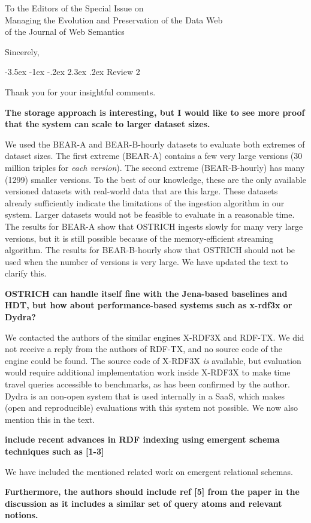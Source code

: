\documentclass{letter}
\makeatletter
\newcounter{section}
\newcommand\section{\@startsection {section}{1}{\z@}%
                                   {-3.5ex \@plus -1ex \@minus -.2ex}%
                                   {2.3ex \@plus.2ex}%
                                   {\normalfont\Large\bfseries}}
\makeatother
\begin{document}
\begin{letter}{To the Editors of the Special Issue on\\Managing the Evolution and Preservation of the Data Web\\of the Journal of Web Semantics}
\closing{Sincerely,}

\pagebreak
\section{Review 2}

Thank you for your insightful comments.

\textbf{The storage approach is interesting, but I would like to see more proof that the system can scale to larger dataset sizes.}

We used the BEAR-A and BEAR-B-hourly datasets to evaluate both extremes of dataset sizes.
The first extreme (BEAR-A) contains a few very large versions (30 million triples for \emph{each version}).
The second extreme (BEAR-B-hourly) has many (1299) smaller versions.
To the best of our knowledge, these are the only available versioned datasets with real-world data
that are this large.
These datasets already sufficiently indicate the limitations of the ingestion algorithm in our system.
Larger datasets would not be feasible to evaluate in a reasonable time.
The results for BEAR-A show that OSTRICH ingests slowly for many very large versions,
but it is still possible because of the memory-efficient streaming algorithm.
The results for BEAR-B-hourly show that OSTRICH should not be used when the number of versions is very large.
We have updated the text to clarify this.

\textbf{OSTRICH can handle itself fine with the Jena-based baselines and HDT, but how about performance-based systems such as x-rdf3x or Dydra?}

We contacted the authors of the similar engines X-RDF3X and RDF-TX.
We did not receive a reply from the authors of RDF-TX, and no source code of the engine could be found.
The source code of X-RDF3X \emph{is} available, but evaluation would require additional implementation work inside X-RDF3X
to make time travel queries accessible to benchmarks, as has been confirmed by the author.
Dydra is an non-open system that is used internally in a SaaS, which makes (open and reproducible) evaluations with this system not possible.
We now also mention this in the text.

\textbf{include recent advances in RDF indexing using emergent schema techniques such as [1-3]}

We have included the mentioned related work on emergent relational schemas.

\textbf{Furthermore, the authors should include ref [5] from the paper in the discussion as it includes a similar set of query atoms and relevant notions.}


\end{letter}
\end{document}
